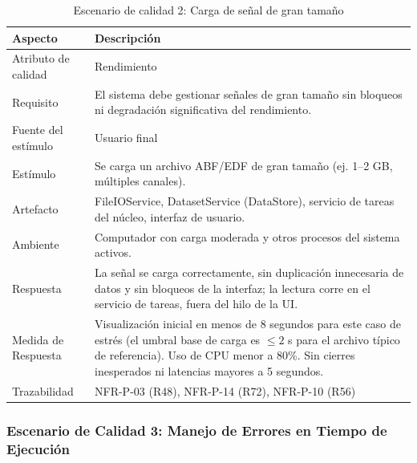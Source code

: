 \documentclass[11pt,a4paper]{article}
\DeclareRobustCommand{\_}{\textunderscore\allowbreak}
\begin{document}
\begin{table}[H]
\centering
\caption{Escenario de calidad 2: Carga de señal de gran tamaño}
\label{tab:escenario2}
\begin{tabularx}{\textwidth}{|l|X|}
\hline
\textbf{Aspecto} & \textbf{Descripción} \\
\hline
Atributo de calidad & Rendimiento \\
\hline
Requisito & El sistema debe gestionar señales de gran tamaño sin bloqueos ni degradación significativa del rendimiento. \\
\hline
Fuente del estímulo & Usuario final \\
\hline
Estímulo & Se carga un archivo ABF/EDF de gran tamaño (ej. 1--2 GB, múltiples canales). \\
\hline
Artefacto & FileIOService, DatasetService (DataStore), servicio de tareas del núcleo, interfaz de usuario. \\
\hline
Ambiente & Computador con carga moderada y otros procesos del sistema activos. \\
\hline
Respuesta & La señal se carga correctamente, sin duplicación innecesaria de datos y sin bloqueos de la interfaz; la lectura corre en el servicio de tareas, fuera del hilo de la UI. \\
\hline
Medida de Respuesta & Visualización inicial en menos de 8 segundos para este caso de estrés (el umbral base de carga es $\leq 2$ s para el archivo típico de referencia). Uso de CPU menor a 80\%. Sin cierres inesperados ni latencias mayores a 5 segundos. \\
\hline
Trazabilidad & NFR-P-03 (R48), NFR-P-14 (R72), NFR-P-10 (R56) \\
\hline
\end{tabularx}
\end{table}

\subsubsection{Escenario de Calidad 3: Manejo de Errores en Tiempo de Ejecución}
\end{document}

